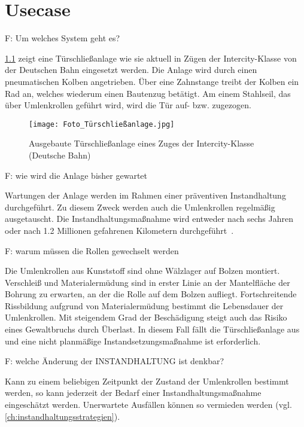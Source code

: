 \chapter{Usecase}
\label{ch:usecase}
F: Um welches System geht es?

\cref{fig:foto_tureschliessanlage} zeigt eine Türschließanlage wie sie aktuell in Zügen der Intercity-Klasse von der Deutschen Bahn eingesetzt werden. Die Anlage wird durch einen pneumatischen Kolben angetrieben. Über eine Zahnstange treibt der Kolben ein Rad an, welches wiederum einen Bautenzug betätigt. Am einem Stahlseil, das über Umlenkrollen geführt wird, wird die Tür auf- bzw. zugezogen.

\begin{figure}[ht]
	\centering
	\texttt{[image: Foto\_Türschließanlage.jpg]}
	\caption{Ausgebaute Türschließanlage eines Zuges der Intercity-Klasse (Deutsche Bahn)}
	\label{fig:foto_tureschliessanlage}
\end{figure}

F: wie wird die Anlage bisher gewartet

Wartungen der Anlage werden im Rahmen einer präventiven Instandhaltung durchgeführt. Zu diesem Zweck werden auch die Umlenkrollen regelmäßig ausgetauscht. Die Instandhaltungsmaßnahme wird entweder nach sechs Jahren oder nach \num{1.2} Millionen gefahrenen Kilometern durchgeführt~\cite{db.2021}.

F: warum müssen die Rollen gewechselt werden

Die Umlenkrollen aus Kunststoff  sind ohne Wälzlager auf Bolzen montiert. Verschleiß und Materialermüdung sind in erster Linie an der Mantelfläche der Bohrung zu erwarten, an der die Rolle auf dem Bolzen aufliegt. Fortschreitende Rissbildung aufgrund von Materialermüdung bestimmt die Lebensdauer der Umlenkrollen. Mit steigendem Grad der Beschädigung steigt auch das Risiko eines Gewaltbruchs durch Überlast. In diesem Fall fällt die Türschließanlage aus und eine nicht planmäßige Instandsetzungsmaßnahme ist erforderlich.

F: welche Änderung der INSTANDHALTUNG ist denkbar?

Kann zu einem beliebigen Zeitpunkt der Zustand der Umlenkrollen bestimmt werden, so kann jederzeit der Bedarf einer Instandhaltungsmaßnahme eingeschätzt werden. Unerwartete Ausfällen können so vermieden werden (vgl. \cref{ch:instandhaltungsstrategien}). 

